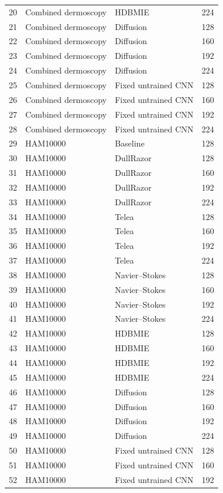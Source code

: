 \begin{longtable}{p{1cm}p{4.2cm}p{4.8cm}p{2cm}}
20 & Combined dermoscopy & HDBMIE & 224 \\
21 & Combined dermoscopy & Diffusion & 128 \\
22 & Combined dermoscopy & Diffusion & 160 \\
23 & Combined dermoscopy & Diffusion & 192 \\
24 & Combined dermoscopy & Diffusion & 224 \\
25 & Combined dermoscopy & Fixed untrained CNN & 128 \\
26 & Combined dermoscopy & Fixed untrained CNN & 160 \\
27 & Combined dermoscopy & Fixed untrained CNN & 192 \\
28 & Combined dermoscopy & Fixed untrained CNN & 224 \\
29 & HAM10000 & Baseline & 128 \\
30 & HAM10000 & DullRazor & 128 \\
31 & HAM10000 & DullRazor & 160 \\
32 & HAM10000 & DullRazor & 192 \\
33 & HAM10000 & DullRazor & 224 \\
34 & HAM10000 & Telea & 128 \\
35 & HAM10000 & Telea & 160 \\
36 & HAM10000 & Telea & 192 \\
37 & HAM10000 & Telea & 224 \\
38 & HAM10000 & Navier--Stokes & 128 \\
39 & HAM10000 & Navier--Stokes & 160 \\
40 & HAM10000 & Navier--Stokes & 192 \\
41 & HAM10000 & Navier--Stokes & 224 \\
42 & HAM10000 & HDBMIE & 128 \\
43 & HAM10000 & HDBMIE & 160 \\
44 & HAM10000 & HDBMIE & 192 \\
45 & HAM10000 & HDBMIE & 224 \\
46 & HAM10000 & Diffusion & 128 \\
47 & HAM10000 & Diffusion & 160 \\
48 & HAM10000 & Diffusion & 192 \\
49 & HAM10000 & Diffusion & 224 \\
50 & HAM10000 & Fixed untrained CNN & 128 \\
51 & HAM10000 & Fixed untrained CNN & 160 \\
52 & HAM10000 & Fixed untrained CNN & 192 \\

\end{longtable}

